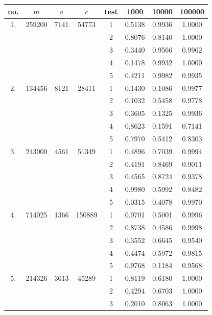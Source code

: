 \documentclass[dvips]{article}
\begin{document}
\begin{table}[htbp]
\centering
\begin{tabular}{|c||c|c|c||c|c|c|c|} \hline
no. & $m$ & $a$ & $c$ & test & 1000 & 10000 & 100000\\ \hline
1. & 259200 & 7141 & 54773   & 1 & 0.5138 & 0.9936 & 1.0000 \\ 
   &        &      &         & 2 & 0.8076 & 0.8140 & 1.0000 \\ 
   &        &      &         & 3 & 0.3440 & 0.9566 & 0.9962 \\
   &        &      &         & 4 & 0.1478 & 0.9932 & 1.0000 \\
   &        &      &         & 5 & 0.4211 & 0.9982 & 0.9935 \\ \hline
2. & 134456 & 8121 & 28411   & 1 & 0.1430 & 0.1086 & 0.9977 \\ 
   &        &      &         & 2 & 0.1032 & 0.5458 & 0.9778 \\ 
   &        &      &         & 3 & 0.3605 & 0.1325 & 0.9936 \\
   &        &      &         & 4 & 0.8623 & 0.1591 & 0.7141 \\
   &        &      &         & 5 & 0.7970 & 0.5412 & 0.8303 \\ \hline
3. & 243000 & 4561 & 51349   & 1 & 0.4896 & 0.7039 & 0.9994 \\
   &        &      &         & 2 & 0.4191 & 0.8469 & 0.9011 \\ 
   &        &      &         & 3 & 0.4565 & 0.8724 & 0.9378 \\
   &        &      &         & 4 & 0.9980 & 0.5992 & 0.8482 \\
   &        &      &         & 5 & 0.0315 & 0.4078 & 0.9970 \\ \hline
4. & 714025 & 1366 & 150889  & 1 & 0.9701 & 0.5001 & 0.9996 \\
   &        &      &         & 2 & 0.8738 & 0.4586 & 0.9998 \\ 
   &        &      &         & 3 & 0.3552 & 0.6645 & 0.9540 \\
   &        &      &         & 4 & 0.4474 & 0.5972 & 0.9815 \\
   &        &      &         & 5 & 0.9768 & 0.1184 & 0.9568 \\ \hline
5. & 214326 & 3613 & 45289   & 1 & 0.8119 & 0.6180 & 1.0000 \\
   &        &      &         & 2 & 0.4294 & 0.6703 & 1.0000 \\ 
   &        &      &         & 3 & 0.2010 & 0.8063 & 1.0000 \\

\end{tabular}
\end{table}
\end{document}

